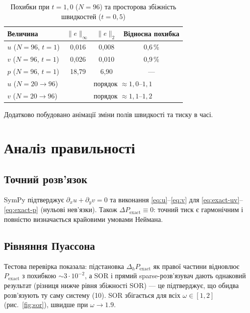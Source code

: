 \documentclass[14pt,a4paper,extarticle]{extarticle}
\begin{document}
\begin{table}[H]
  \caption{Похибки при $t=1{,}0$ ($N=96$) та просторова збіжність швидкостей ($t=0{,}5$)}
  \label{tab:errors}
  \centering
  \renewcommand{\arraystretch}{1.2}
  \begin{tabular}{|l|c|c|c|}
    \hline
    Величина & $\|e\|_\infty$ & $\|e\|_2$ & Відносна похибка \\
    \hline
    $u$ ($N=96$, $t=1$) & 0,016 & 0,008 & 0,6\,\% \\
    $v$ ($N=96$, $t=1$) & 0,026 & 0,010 & 0,9\,\% \\
    $p$ ($N=96$, $t=1$) & 18,79 & 6,90 & --- \\
    \hline
    $u$ ($N=20\to96$) & \multicolumn{3}{c|}{порядок $\approx 1{,}0$--$1{,}1$} \\
    $v$ ($N=20\to96$) & \multicolumn{3}{c|}{порядок $\approx 1{,}1$--$1{,}2$} \\
    \hline
  \end{tabular}
\end{table}

Додатково побудовано анімації зміни полів швидкості та тиску в часі.

\section{Аналіз правильності}

\subsection{Точний розв'язок}

SymPy підтверджує $\partial_x u+\partial_y v=0$ та виконання \eqref{eq:u}--\eqref{eq:v}
для \eqref{eq:exact-uv}--\eqref{eq:exact-p} (нульові нев'язки). Також
$\Delta P_{\text{exact}}\equiv0$: точний тиск є гармонічним і повністю
визначається крайовими умовами Неймана.

\subsection{Рівняння Пуассона}

Тестова перевірка показала: підстановка $\Delta_h P_{\text{exact}}$ як правої
частини відновлює $P_{\text{exact}}$ з похибкою $\sim3\cdot10^{-2}$, а SOR і
прямий sparse-розв'язувач дають однаковий результат (різниця нижче рівня
збіжності SOR) --- це підтверджує, що обидва розв'язують ту саму систему (10).
SOR збігається для всіх $\omega\in[1,2]$ (рис.~\ref{fig:sor}), швидше при
$\omega\to1.9$.
\end{document}
